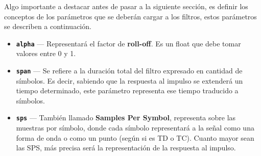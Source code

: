    Algo importante a destacar antes de pasar a la siguiente sección, es definir los conceptos de los parámetros que se deberán cargar a los filtros, estos
    parámetros se describen a continuación.
    \begin{itemize}
        \item \texttt{\textbf{alpha}} ---
            Representará el factor de \textbf{roll-off}. Es un float que debe tomar valores entre 0 y 1.
        \item \texttt{\textbf{span}} ---
            Se refiere a la duración total del filtro expresado en cantidad de símbolos. Es decir, sabiendo que la respuesta al impulso se extenderá
            un tiempo determinado, este parámetro representa ese tiempo traducido a símbolos.
        \item \texttt{\textbf{sps}} ---
            También llamado \textbf{Samples Per Symbol}, representa sobre las muestras por símbolo, donde cada símbolo representará a 
            la señal como una forma de onda o como un punto (según si es TD o TC).
            Cuanto mayor sean las SPS, más precisa será la representación de la respuesta al impulso.
    \end{itemize}
